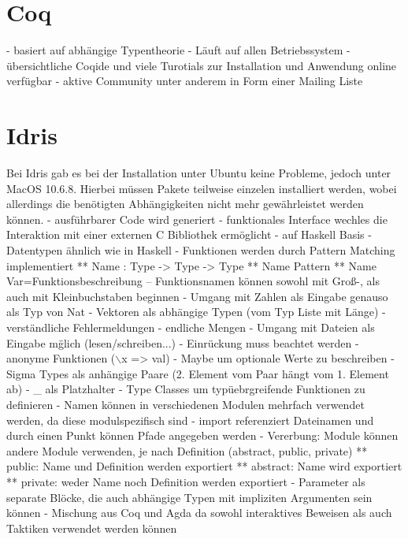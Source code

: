 \section{Coq}
- basiert auf abh\"angige Typentheorie
- L\"auft auf allen Betriebssystem
- \"ubersichtliche Coqide und viele Turotials zur Installation und Anwendung online verf\"ugbar
- aktive Community unter anderem in Form einer Mailing Liste

\section{Idris}
Bei Idris gab es bei der Installation unter Ubuntu keine Probleme, jedoch unter MacOS 10.6.8. Hierbei m\"ussen Pakete teilweise einzelen installiert werden, wobei allerdings die ben\"otigten Abh\"angigkeiten nicht mehr gew\"ahrleistet werden k\"onnen.
- ausf\"uhrbarer Code wird generiert
- funktionales Interface wechles die Interaktion mit einer externen C Bibliothek erm\"oglicht
- auf Haskell Basis
- Datentypen \"ahnlich wie in Haskell
- Funktionen werden durch Pattern Matching implementiert
** Name : Type -> Type -> Type
** Name Pattern
** Name Var=Funktionsbeschreibung
-- Funktionsnamen k\"onnen sowohl mit Gro\ss{}-, als auch mit Kleinbuchstaben beginnen
- Umgang mit Zahlen als Eingabe genauso als Typ von Nat
- Vektoren als abh\"angige Typen (vom Typ Liste mit L\"ange) %
- verst\"andliche Fehlermeldungen
- endliche Mengen %
- Umgang mit Dateien als Eingabe m\"glich (lesen/schreiben...) %
- Einr\"uckung muss beachtet werden %
- anonyme Funktionen ($\backslash$x => val) %
- Maybe um optionale Werte zu beschreiben
- Sigma Types als anh\"angige Paare (2. Element vom Paar h\"angt vom 1. Element ab)
- \_ als Platzhalter
- Type Classes um typ\"uebrgreifende Funktionen zu definieren %
- Namen k\"onnen in verschiedenen Modulen mehrfach verwendet werden, da diese modulspezifisch sind
- import referenziert Dateinamen und durch einen Punkt k\"onnen Pfade angegeben werden %
- Vererbung: Module k\"onnen andere Module verwenden, je nach Definition (abstract, public, private)
** public: Name und Definition werden exportiert
** abstract: Name wird exportiert
** private: weder Name noch Definition werden exportiert %
- Parameter als separate Bl\"ocke, die auch abh\"angige Typen mit impliziten Argumenten sein k\"onnen
- Mischung aus Coq und Agda da sowohl interaktives Beweisen als auch Taktiken verwendet werden k\"onnen %


